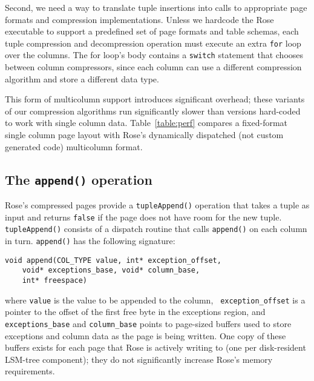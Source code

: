 \documentclass{vldb}
\newcommand{\rows}{Rose\xspace}
\newcommand{\rowss}{Rose's\xspace}
\newcommand{\xxx}[1]{\textcolor{red}{\bf XXX: #1}}
\renewcommand{\xxx}[1]{\xspace}
\begin{document}
Second, we need a way to translate tuple insertions into
calls to appropriate page formats and compression implementations.
Unless we hardcode the \rows executable to support a predefined set of
page formats and table schemas, each tuple compression and decompression operation must execute an extra {\tt for} loop
over the columns.  The for loop's body contains a {\tt switch} statement that chooses between column compressors, since each column can use a different compression algorithm and store a different data type.

This form of multicolumn support introduces significant overhead;
these variants of our compression algorithms run significantly slower
than versions hard-coded to work with single column data.
Table~\ref{table:perf} compares a fixed-format single column page
layout with \rowss dynamically dispatched (not custom generated code)
multicolumn format. \xxx{any way to compare with static page layouts??}


\subsection{The {\tt \large append()} operation}

\rowss compressed pages provide a {\tt tupleAppend()} operation that
takes a tuple as input and returns {\tt false} if the page does not have
room for the new tuple.  {\tt tupleAppend()} consists of a dispatch
routine that calls {\tt append()} on each column in turn.
{\tt append()} has the
following signature:
\begin{verbatim}
void append(COL_TYPE value, int* exception_offset,
    void* exceptions_base, void* column_base,
    int* freespace)
\end{verbatim}
where {\tt value} is the value to be appended to the column, {\tt
  exception\_offset} is a pointer to the offset of the first free byte in the
exceptions region, and {\tt exceptions\_base} and {\tt column\_base} points
to page-sized buffers used to store exceptions and column data as
the page is being written.  One copy of these buffers exists for
each page that \rows is actively writing to (one per disk-resident
LSM-tree component); they do not significantly increase \rowss memory
requirements.
\end{document}
